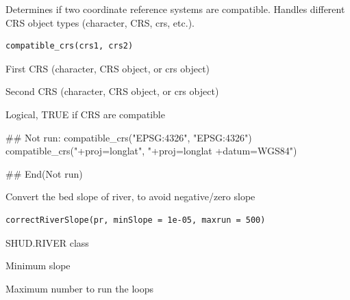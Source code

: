 \documentclass[a4paper]{book}
\begin{document}
%
\begin{Description}\relax
Determines if two coordinate reference systems are compatible.
Handles different CRS object types (character, CRS, crs, etc.).
\end{Description}
%
\begin{Usage}
\begin{verbatim}
compatible_crs(crs1, crs2)
\end{verbatim}
\end{Usage}
%
\begin{Arguments}
\begin{ldescription}
\item[\code{crs1}] First CRS (character, CRS object, or crs object)

\item[\code{crs2}] Second CRS (character, CRS object, or crs object)
\end{ldescription}
\end{Arguments}
%
\begin{Value}
Logical, TRUE if CRS are compatible
\end{Value}
%
\begin{Examples}
\begin{ExampleCode}
## Not run: 
compatible_crs("EPSG:4326", "EPSG:4326")
compatible_crs("+proj=longlat", "+proj=longlat +datum=WGS84")

## End(Not run)
\end{ExampleCode}
\end{Examples}
%
\begin{Description}\relax
Convert the bed slope of river, to avoid negative/zero slope
\end{Description}
%
\begin{Usage}
\begin{verbatim}
correctRiverSlope(pr, minSlope = 1e-05, maxrun = 500)
\end{verbatim}
\end{Usage}
%
\begin{Arguments}
\begin{ldescription}
\item[\code{pr}] SHUD.RIVER class

\item[\code{minSlope}] Minimum slope

\item[\code{maxrun}] Maximum number to run the loops
\end{ldescription}
\end{Arguments}
\end{document}
